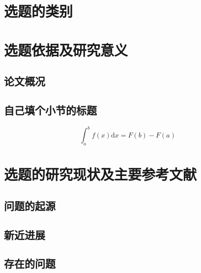 \documentclass{proposal}
\newcommand{\dif}{\mathrm{d}}
\begin{document}
\linenumbers
\section{选题的类别}
\SectionEndLine				   %


\section{选题依据及研究意义}
\zhlipsum[2]
\subsection{论文概况}
\zhlipsum[1]

\subsection{自己填个小节的标题}
\zhlipsum[1]

$$\int^b_a f(x)\dif x = F(b) - F(a)$$

\SectionEndLine				   %


\section{选题的研究现状及主要参考文献}

\subsection{问题的起源}
\zhlipsum[1]

\subsection{新近进展}

\zhlipsum[1]

\subsection{存在的问题}
\end{document}
